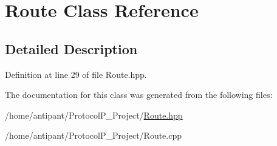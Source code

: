 \hypertarget{classRoute}{\section{Route Class Reference}
\label{classRoute}
}


\subsection{Detailed Description}


Definition at line 29 of file Route.\-hpp.



The documentation for this class was generated from the following files\-:\begin{DoxyCompactItemize}
\item 
/home/antipant/\-Protocol\-P\-\_\-\-Project/\hyperlink{Route_8hpp}{Route.\-hpp}\item 
/home/antipant/\-Protocol\-P\-\_\-\-Project/Route.\-cpp\end{DoxyCompactItemize}
